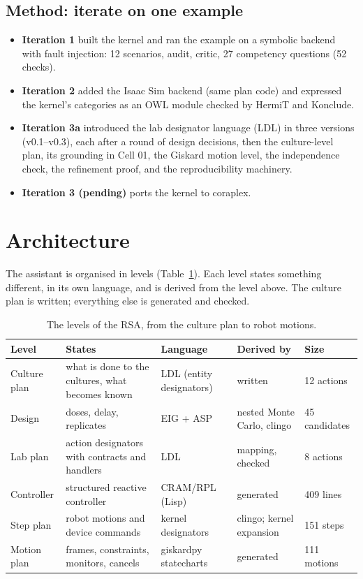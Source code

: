 \documentclass[10pt,a4paper]{article}
\begin{document}
\subsection{Method: iterate on one example}\label{sec:method}

\begin{itemize}
  \item \textbf{Iteration 1} built the kernel and ran the example on a symbolic backend with fault injection: 12 scenarios, audit, critic, 27 competency questions (52 checks).
  \item \textbf{Iteration 2} added the Isaac Sim backend (same plan code) and expressed the kernel's categories as an OWL module checked by HermiT and Konclude.
  \item \textbf{Iteration 3a} introduced the lab designator language (LDL) in three versions (v0.1–v0.3), each after a round of design decisions, then the culture-level plan, its grounding in Cell 01, the Giskard motion level, the independence check, the refinement proof, and the reproducibility machinery.
  \item \textbf{Iteration 3 (pending)} ports the kernel to coraplex.
\end{itemize}

\section{Architecture}\label{sec:arch}

The assistant is organised in levels (Table~\ref{tab:levels}). Each level states something different, in its own language, and is derived from the level above. The culture plan is written; everything else is generated and checked.

\begin{table}[tbp]\centering\small
\caption{The levels of the RSA, from the culture plan to robot motions.}\label{tab:levels}
\begin{tabularx}{\linewidth}{lXlll}\toprule
\textbf{Level} & \textbf{States} & \textbf{Language} & \textbf{Derived by} & \textbf{Size} \\\midrule
Culture plan & what is done to the cultures, what becomes known & LDL (entity designators) & written & 12 actions \\
Design & doses, delay, replicates & EIG + ASP & nested Monte Carlo, clingo & 45 candidates \\
Lab plan & action designators with contracts and handlers & LDL & mapping, checked & 8 actions \\
Controller & structured reactive controller & CRAM/RPL (Lisp) & generated & 409 lines \\
Step plan & robot motions and device commands & kernel designators & clingo; kernel expansion & 151 steps \\
Motion plan & frames, constraints, monitors, cancels & giskardpy statecharts & generated & 111 motions \\\bottomrule
\end{tabularx}
\end{table}
\end{document}
